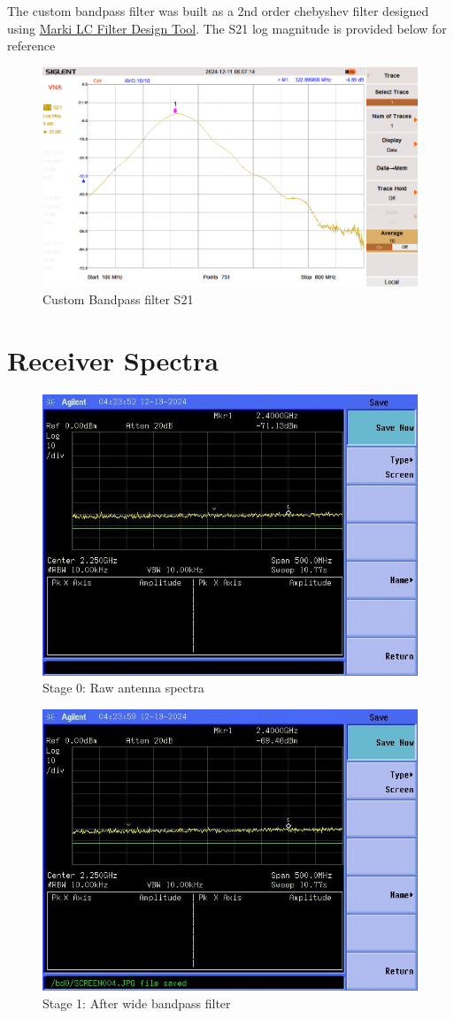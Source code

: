 \documentclass[letterpaper,12pt]{article}
\begin{document}
The custom bandpass filter was built as a 2nd order chebyshev filter designed using \href{https://markimicrowave.com/technical-resources/tools/lc-filter-design-tool/}{Marki LC Filter Design Tool}. The S21 log magnitude is provided below for reference
\begin{figure}[H]
	\begin{centering}
		\includegraphics[width=1\columnwidth]{figures/bpf_s21.png}
		\caption{Custom Bandpass filter S21}
	\end{centering}
\end{figure}

\newpage
\section{Receiver Spectra}
\begin{figure}[H]
	\begin{centering}
		\includegraphics[width=0.5\columnwidth]{figures/receiver_spectra/0.beginning}
		\caption{Stage 0: Raw antenna spectra}
	\end{centering}
\end{figure}

\begin{figure}[H]
	\begin{centering}
		\includegraphics[width=0.5\columnwidth]{figures/receiver_spectra/1.bpf}
		\caption{Stage 1: After wide bandpass filter}
	\end{centering}
\end{figure}
\end{document}
